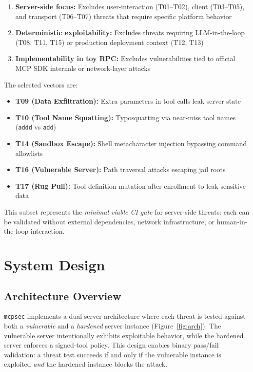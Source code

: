 \documentclass[11pt]{article}
\begin{document}
\begin{enumerate}
    \item \textbf{Server-side focus:} Excludes user-interaction (T01--T02), client (T03--T05), and transport (T06--T07) threats that require specific platform behavior
    \item \textbf{Deterministic exploitability:} Excludes threats requiring LLM-in-the-loop (T08, T11, T15) or production deployment context (T12, T13)
    \item \textbf{Implementability in toy RPC:} Excludes vulnerabilities tied to official MCP SDK internals or network-layer attacks
\end{enumerate}

The selected vectors are:

\begin{itemize}
    \item \textbf{T09 (Data Exfiltration):} Extra parameters in tool calls leak server state
    \item \textbf{T10 (Tool Name Squatting):} Typosquatting via near-miss tool names (\texttt{addd} vs \texttt{add})
    \item \textbf{T14 (Sandbox Escape):} Shell metacharacter injection bypassing command allowlists
    \item \textbf{T16 (Vulnerable Server):} Path traversal attacks escaping jail roots
    \item \textbf{T17 (Rug Pull):} Tool definition mutation after enrollment to leak sensitive data
\end{itemize}

This subset represents the \emph{minimal viable CI gate} for server-side threats: each can be validated without external dependencies, network infrastructure, or human-in-the-loop interaction.

\section{System Design}
\label{sec:design}

\subsection{Architecture Overview}

\texttt{mcpsec} implements a dual-server architecture where each threat is tested against both a \emph{vulnerable} and a \emph{hardened} server instance (Figure~\ref{fig:arch}). The vulnerable server intentionally exhibits exploitable behavior, while the hardened server enforces a signed-tool policy. This design enables binary pass/fail validation: a threat test succeeds if and only if the vulnerable instance is exploited \emph{and} the hardened instance blocks the attack.
\end{document}
